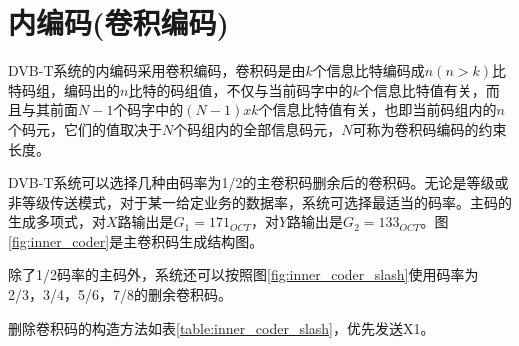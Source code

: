 	\section{内编码(卷积编码)}
		\par DVB-T系统的内编码采用卷积编码，卷积码是由$k$个信息比特编码成$n(n>k)$比特码组，编码出的$n$比特的码组值，不仅与当前码字中的$k$个信息比特值有关，而且与其前面$N-1$个码字中的$(N-1)xk$个信息比特值有关，也即当前码组内的$n$个码元，它们的值取决于$N$个码组内的全部信息码元，$N$可称为卷积码编码的约束长度。
		\par DVB-T系统可以选择几种由码率为1/2的主卷积码删余后的卷积码。无论是等级或非等级传送模式，对于某一给定业务的数据率，系统可选择最适当的码率。主码的生成多项式，对$X$路输出是$G_1=171_{OCT}$，对$Y$路输出是$G_2=133_{OCT}$。图\ref{fig:inner_coder}是主卷积码生成结构图。
		
		\par 除了1/2码率的主码外，系统还可以按照图\ref{fig:inner_coder_slash}使用码率为2/3，3/4，5/6，7/8的删余卷积码。
		
		\par 删除卷积码的构造方法如表\ref{table:inner_coder_slash}，优先发送X1。
		
